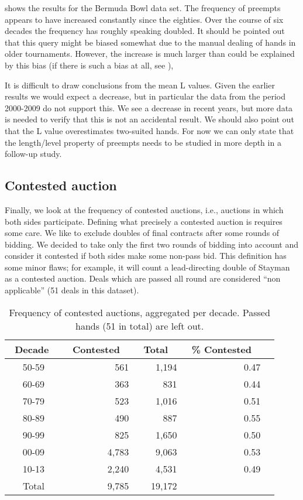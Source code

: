 \documentclass{icga}
\begin{document}
 shows the results for the Bermuda Bowl data set. The
frequency of preempts appears to have increased constantly since the
eighties. Over the course of six decades the frequency has roughly
speaking doubled. It should be pointed out that this query might be
biased somewhat due to the manual dealing of hands in older
tournaments. However, the increase is much larger than could be
explained by this bias (if there is such a bias at all, see
),

It is difficult to draw conclusions from the mean L values. Given the
earlier results we would expect a decrease, but in particular the data
from the period 2000-2009 do not support this.  We see a decrease in
recent years, but more data is needed to verify that this is not an
accidental result.  We should also point out that the L value
overestimates two-suited hands.  For now we can only state that
the length/level property of preempts needs to be studied in more
depth in a follow-up study.

\subsection{Contested auction}

Finally, we look at the frequency of contested auctions, i.e.,
auctions in which both sides participate. Defining what precisely a
contested auction is requires some care. We like to exclude doubles of
final contracts after some rounds of bidding. We decided to take only
the first two rounds of bidding into account and consider it contested
if both sides make some non-pass bid. This definition has some minor
flaws; for example, it will count a lead-directing double of Stayman
as a contested auction.  Deals which are passed all round are
considered ``non applicable'' (51 deals in this dataset).

\begin{table}[hb]
\centering\footnotesize
\begin{tabular}{|c|r|r|r|r|}
\hline
\bf \ Decade \ & \bf \ Contested \ & \bf \ Total \  & 
\bf \ \% Contested \ \\ \hline
50-59 & 561 & 1,194 & 0.47 \\
60-69 & 363 & 831 & 0.44\\
70-79 & 523 & 1,016 & 0.51\\
80-89 & 490 & 887 & 0.55\\
90-99 & 825 & 1,650 & 0.50\\
00-09 & 4,783 & 9,063 & 0.53\\
10-13 & 2,240 & 4,531 & 0.49\\
\hline
Total  & 9,785 & 19,172 & \\ 
\hline
\end{tabular}
\caption{Frequency of contested auctions, aggregated per
decade. Passed hands (51 in total) are left out.}  
\label{tbl:contested-auction}
\end{table}
\end{document}
